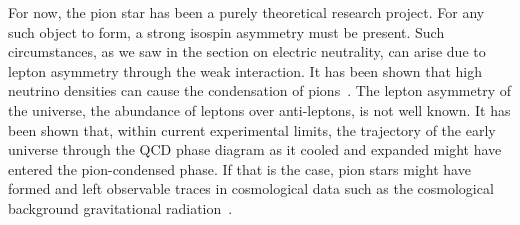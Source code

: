 For now, the pion star has been a purely theoretical research project.
For any such object to form, a strong isospin asymmetry must be present.
Such circumstances, as we saw in the section on electric neutrality, can arise due to lepton asymmetry through the weak interaction.
It has been shown that high neutrino densities can cause the condensation of pions~\autocite{abukiPionCondensationDense2009}.
The lepton asymmetry of the universe, the abundance of leptons over anti-leptons, is not well known.
It has been shown that, within current experimental limits, the trajectory of the early universe through the QCD phase diagram as it cooled and expanded might have entered the pion-condensed phase.
If that is the case, pion stars might have formed and left observable traces in cosmological data such as the cosmological background gravitational radiation~\autocite{vovchenkoPionCondensationEarly2021,wygasCosmicQCDEpoch2018}.

